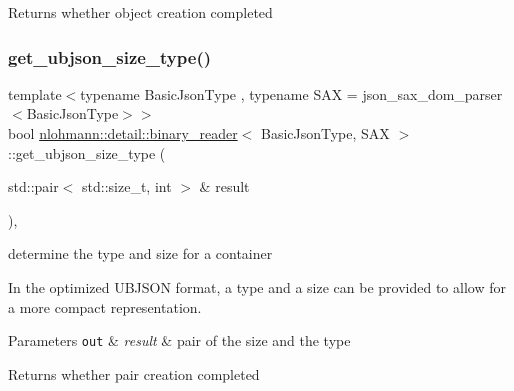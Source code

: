 \begin{DoxyReturn}{Returns}
whether object creation completed 
\end{DoxyReturn}
\mbox{\label{classnlohmann_1_1detail_1_1binary__reader_a4eae4604064b5dfe6d04e42ffc9e0753}} 
\subsubsection{\texorpdfstring{get\+\_\+ubjson\+\_\+size\+\_\+type()}{get\_ubjson\_size\_type()}}
{\footnotesize\ttfamily template$<$typename Basic\+Json\+Type , typename S\+AX  = json\+\_\+sax\+\_\+dom\+\_\+parser$<$\+Basic\+Json\+Type$>$$>$ \\
bool \hyperlink{classnlohmann_1_1detail_1_1binary__reader}{nlohmann\+::detail\+::binary\+\_\+reader}$<$ Basic\+Json\+Type, S\+AX $>$\+::get\+\_\+ubjson\+\_\+size\+\_\+type (\begin{DoxyParamCaption}\item[{std\+::pair$<$ std\+::size\+\_\+t, int $>$ \&}]{result }\end{DoxyParamCaption})\hspace{0.3cm}{\ttfamily [inline]}, {\ttfamily [private]}}



determine the type and size for a container 

In the optimized U\+B\+J\+S\+ON format, a type and a size can be provided to allow for a more compact representation.


\begin{DoxyParams}[1]{Parameters}
\mbox{\tt out}  & {\em result} & pair of the size and the type\\
\hline
\end{DoxyParams}
\begin{DoxyReturn}{Returns}
whether pair creation completed 
\end{DoxyReturn}
\mbox{\label{classnlohmann_1_1detail_1_1binary__reader_a435be58e83c8491556d8f1a1b3439155}} 
